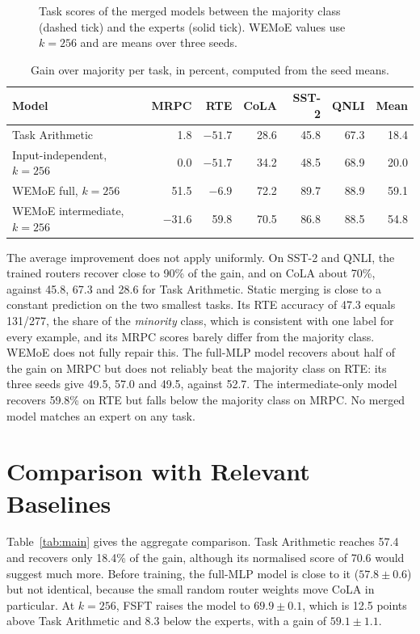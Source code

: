 \begin{figure}[htbp]
  \centering
  
  \caption{Task scores of the merged models between the majority class (dashed tick) and the experts (solid tick). WEMoE values use $k=256$ and are means over three seeds.}
  \label{fig:per-task}
\end{figure}

\begin{table}[htbp]
  \centering\tablestyle
  \caption{Gain over majority per task, in percent, computed from the seed means.}
  \label{tab:gain}
  \begin{tabular}{l r r r r r r}
    \toprule
    Model & MRPC & RTE & CoLA & SST-2 & QNLI & Mean\\
    \midrule
    Task Arithmetic & 1.8 & $-51.7$ & 28.6 & 45.8 & 67.3 & 18.4\\
    Input-independent, $k=256$ & 0.0 & $-51.7$ & 34.2 & 48.5 & 68.9 & 20.0\\
    WEMoE full, $k=256$ & 51.5 & $-6.9$ & 72.2 & 89.7 & 88.9 & 59.1\\
    WEMoE intermediate, $k=256$ & $-31.6$ & 59.8 & 70.5 & 86.8 & 88.5 & 54.8\\
    \bottomrule
  \end{tabular}
\end{table}

The average improvement does not apply uniformly. On SST-2 and QNLI, the trained routers recover close to 90\% of the gain, and on CoLA about 70\%, against 45.8, 67.3 and 28.6 for Task Arithmetic. Static merging is close to a constant prediction on the two smallest tasks. Its RTE accuracy of 47.3 equals 131/277, the share of the \emph{minority} class, which is consistent with one label for every example, and its MRPC scores barely differ from the majority class. WEMoE does not fully repair this. The full-MLP model recovers about half of the gain on MRPC but does not reliably beat the majority class on RTE: its three seeds give 49.5, 57.0 and 49.5, against 52.7. The intermediate-only model recovers 59.8\% on RTE but falls below the majority class on MRPC. No merged model matches an expert on any task.

\section{Comparison with Relevant Baselines}

Table~\ref{tab:main} gives the aggregate comparison. Task Arithmetic reaches 57.4 and recovers only 18.4\% of the gain, although its normalised score of 70.6 would suggest much more. Before training, the full-MLP model is close to it ($57.8\pm0.6$) but not identical, because the small random router weights move CoLA in particular. At $k=256$, FSFT raises the model to $69.9\pm0.1$, which is 12.5 points above Task Arithmetic and 8.3 below the experts, with a gain of $59.1\pm1.1$.

